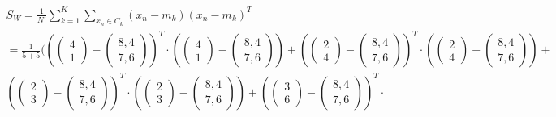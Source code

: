 \documentclass[a4paper,parskip=full-]{article}
\begin{document}
\begin{multline*}
S_W =  \frac{1}{N'} \sum^K_{k=1} \sum_{x_n \in C_k} (x_n-m_k)(x_n-m_k)^T \\
=  \frac{1}{5+5} \Biggl(
\left( \begin{pmatrix} 4 \\ 1 \end{pmatrix} - \begin{pmatrix} 8,4 \\ 7,6 \end{pmatrix} \right)^T \cdot
\left( \begin{pmatrix} 4 \\ 1 \end{pmatrix} - \begin{pmatrix} 8,4 \\ 7,6 \end{pmatrix} \right) + 
\left( \begin{pmatrix} 2 \\ 4 \end{pmatrix} - \begin{pmatrix} 8,4 \\ 7,6 \end{pmatrix} \right)^T \cdot
\left( \begin{pmatrix} 2 \\ 4 \end{pmatrix} - \begin{pmatrix} 8,4 \\ 7,6 \end{pmatrix} \right) + \\
\left( \begin{pmatrix} 2 \\ 3 \end{pmatrix} - \begin{pmatrix} 8,4 \\ 7,6 \end{pmatrix} \right)^T \cdot
\left( \begin{pmatrix} 2 \\ 3 \end{pmatrix} - \begin{pmatrix} 8,4 \\ 7,6 \end{pmatrix} \right) + 
\left( \begin{pmatrix} 3 \\ 6 \end{pmatrix} - \begin{pmatrix} 8,4 \\ 7,6 \end{pmatrix} \right)^T \cdot

\end{multline*}
\end{document}
